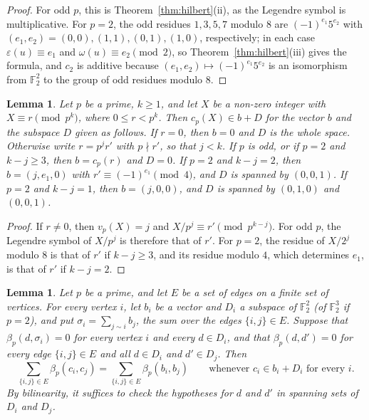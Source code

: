 \documentclass[11pt]{article}
\newtheorem{lemma}[theorem]{Lemma}
\newcommand{\F}{\mathbb{F}}
\begin{document}
\begin{proof}
For odd $p$, this is Theorem~\ref{thm:hilbert}(ii), as the Legendre symbol is multiplicative. For $p=2$, the odd residues $1,3,5,7$ modulo $8$ are $(-1)^{e_1}5^{e_2}$ with $(e_1,e_2)=(0,0),(1,1),(0,1),(1,0)$, respectively; in each case $\varepsilon(u)\equiv e_1$ and $\omega(u)\equiv e_2\pmod2$, so Theorem~\ref{thm:hilbert}(iii) gives the formula, and $c_2$ is additive because $(e_1,e_2)\mapsto(-1)^{e_1}5^{e_2}$ is an isomorphism from $\F_2^2$ to the group of odd residues modulo $8$.
\end{proof}

\begin{lemma}\label{lem:residue}
Let $p$ be a prime, $k\geq1$, and let $X$ be a non-zero integer with $X\equiv r\pmod{p^k}$, where $0\leq r<p^k$. Then $c_p(X)\in b+D$ for the vector $b$ and the subspace $D$ given as follows. If $r=0$, then $b=0$ and $D$ is the whole space. Otherwise write $r=p^jr'$ with $p\nmid r'$, so that $j<k$. If $p$ is odd, or if $p=2$ and $k-j\geq3$, then $b=c_p(r)$ and $D=0$. If $p=2$ and $k-j=2$, then $b=(j,e_1,0)$ with $r'\equiv(-1)^{e_1}\pmod4$, and $D$ is spanned by $(0,0,1)$. If $p=2$ and $k-j=1$, then $b=(j,0,0)$, and $D$ is spanned by $(0,1,0)$ and $(0,0,1)$.
\end{lemma}

\begin{proof}
If $r\neq0$, then $v_p(X)=j$ and $X/p^j\equiv r'\pmod{p^{k-j}}$. For odd $p$, the Legendre symbol of $X/p^j$ is therefore that of $r'$. For $p=2$, the residue of $X/2^j$ modulo $8$ is that of $r'$ if $k-j\geq3$, and its residue modulo $4$, which determines $e_1$, is that of $r'$ if $k-j=2$.
\end{proof}

\begin{lemma}\label{lem:envelope}
Let $p$ be a prime, and let $E$ be a set of edges on a finite set of vertices. For every vertex $i$, let $b_i$ be a vector and $D_i$ a subspace of $\F_2^2$ (of $\F_2^3$ if $p=2$), and put $\sigma_i=\sum_{j\sim i}b_j$, the sum over the edges $\{i,j\}\in E$. Suppose that $\beta_p(d,\sigma_i)=0$ for every vertex $i$ and every $d\in D_i$, and that $\beta_p(d,d')=0$ for every edge $\{i,j\}\in E$ and all $d\in D_i$ and $d'\in D_j$. Then
\[
\sum_{\{i,j\}\in E}\beta_p(c_i,c_j)=\sum_{\{i,j\}\in E}\beta_p(b_i,b_j)\qquad\text{whenever $c_i\in b_i+D_i$ for every $i$.}
\]
By bilinearity, it suffices to check the hypotheses for $d$ and $d'$ in spanning sets of $D_i$ and $D_j$.
\end{lemma}
\end{document}
